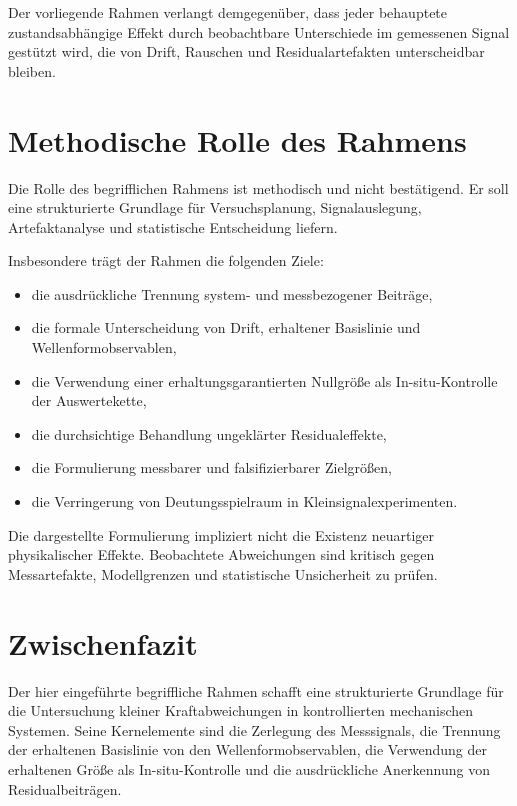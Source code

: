 \documentclass[12pt,a4paper]{report}
\begin{document}
Der vorliegende Rahmen verlangt demgegenüber, dass jeder behauptete
zustandsabhängige Effekt durch beobachtbare Unterschiede im gemessenen
Signal gestützt wird, die von Drift, Rauschen und Residualartefakten
unterscheidbar bleiben.

\section{Methodische Rolle des Rahmens}

Die Rolle des begrifflichen Rahmens ist methodisch und nicht
bestätigend. Er soll eine strukturierte Grundlage für Versuchsplanung,
Signalauslegung, Artefaktanalyse und statistische Entscheidung liefern.

Insbesondere trägt der Rahmen die folgenden Ziele:

\begin{itemize}
\item die ausdrückliche Trennung system- und messbezogener Beiträge,
\item die formale Unterscheidung von Drift, erhaltener Basislinie und
      Wellenformobservablen,
\item die Verwendung einer erhaltungsgarantierten Nullgröße als
      In-situ-Kontrolle der Auswertekette,
\item die durchsichtige Behandlung ungeklärter Residualeffekte,
\item die Formulierung messbarer und falsifizierbarer Zielgrößen,
\item die Verringerung von Deutungsspielraum in
      Kleinsignalexperimenten.
\end{itemize}

Die dargestellte Formulierung impliziert nicht die Existenz neuartiger
physikalischer Effekte. Beobachtete Abweichungen sind kritisch gegen
Messartefakte, Modellgrenzen und statistische Unsicherheit zu prüfen.

\section{Zwischenfazit}

Der hier eingeführte begriffliche Rahmen schafft eine strukturierte
Grundlage für die Untersuchung kleiner Kraftabweichungen in
kontrollierten mechanischen Systemen. Seine Kernelemente sind die
Zerlegung des Messsignals, die Trennung der erhaltenen Basislinie von den
Wellenformobservablen, die Verwendung der erhaltenen Größe als
In-situ-Kontrolle und die ausdrückliche Anerkennung von
Residualbeiträgen.
\end{document}
